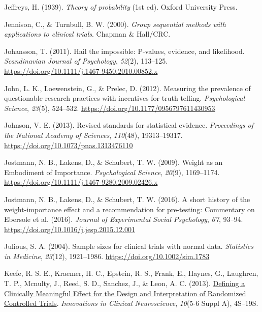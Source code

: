 \documentclass[
  letterpaper,
  DIV=11,
  numbers=noendperiod]{scrreprt}
\newlength{\cslhangindent}
\newlength{\cslentryspacingunit} %
\newenvironment{CSLReferences}[2] %
 {%
  \setlength{\parindent}{0pt}
  \ifodd #1
  \let\oldpar\par
  \def\par{\hangindent=\cslhangindent\oldpar}
  \fi
  \setlength{\parskip}{#2\cslentryspacingunit}
 }%
 {}
\begin{document}
\begin{CSLReferences}{1}{0}
\leavevmode{}%
Jeffreys, H. (1939). \emph{Theory of probability} (1st ed). {Oxford
University Press}.

\leavevmode{}%
Jennison, C., \& Turnbull, B. W. (2000). \emph{Group sequential methods
with applications to clinical trials}. {Chapman \& Hall/CRC}.

\leavevmode{}%
Johansson, T. (2011). Hail the impossible: P-values, evidence, and
likelihood. \emph{Scandinavian Journal of Psychology}, \emph{52}(2),
113--125. \url{https://doi.org/10.1111/j.1467-9450.2010.00852.x}

\leavevmode{}%
John, L. K., Loewenstein, G., \& Prelec, D. (2012). Measuring the
prevalence of questionable research practices with incentives for truth
telling. \emph{Psychological Science}, \emph{23}(5), 524--532.
\url{https://doi.org/10.1177/0956797611430953}

\leavevmode{}%
Johnson, V. E. (2013). Revised standards for statistical evidence.
\emph{Proceedings of the National Academy of Sciences}, \emph{110}(48),
19313--19317. \url{https://doi.org/10.1073/pnas.1313476110}

\leavevmode{}%
Jostmann, N. B., Lakens, D., \& Schubert, T. W. (2009). Weight as an
{Embodiment} of {Importance}. \emph{Psychological Science},
\emph{20}(9), 1169--1174.
\url{https://doi.org/10.1111/j.1467-9280.2009.02426.x}

\leavevmode{}%
Jostmann, N. B., Lakens, D., \& Schubert, T. W. (2016). A short history
of the weight-importance effect and a recommendation for pre-testing:
{Commentary} on {Ebersole} et al. (2016). \emph{Journal of Experimental
Social Psychology}, \emph{67}, 93--94.
\url{https://doi.org/10.1016/j.jesp.2015.12.001}

\leavevmode{}%
Julious, S. A. (2004). Sample sizes for clinical trials with normal
data. \emph{Statistics in Medicine}, \emph{23}(12), 1921--1986.
\url{https://doi.org/10.1002/sim.1783}

\leavevmode{}%
Keefe, R. S. E., Kraemer, H. C., Epstein, R. S., Frank, E., Haynes, G.,
Laughren, T. P., Mcnulty, J., Reed, S. D., Sanchez, J., \& Leon, A. C.
(2013).
\href{https://www.ncbi.nlm.nih.gov/pmc/articles/PMC3719483}{Defining a
{Clinically Meaningful Effect} for the {Design} and {Interpretation} of
{Randomized Controlled Trials}}. \emph{Innovations in Clinical
Neuroscience}, \emph{10}(5-6 Suppl A), 4S--19S.


\end{CSLReferences}
\end{document}
